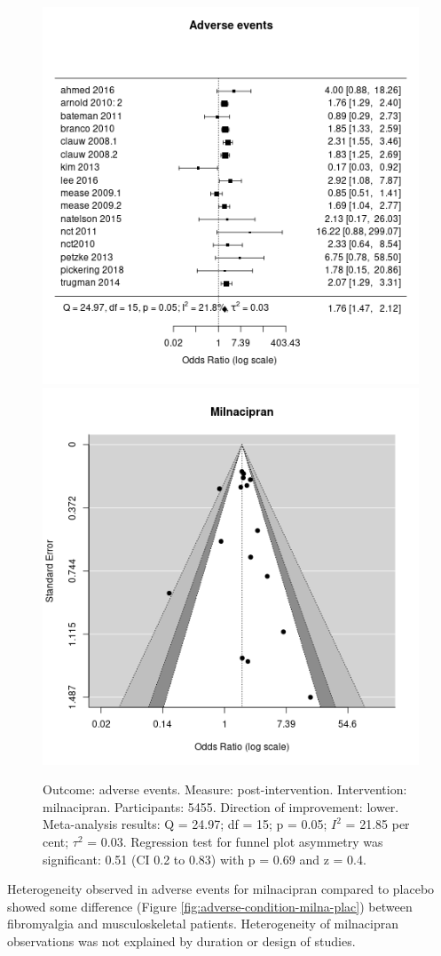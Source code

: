 \documentclass{report}\usepackage[]{graphicx}\usepackage[]{color}
\newenvironment{knitrout}{}{} %
\begin{document}
\begin{figure}

\begin{knitrout}
\color{fgcolor}
\includegraphics[width=0.5\linewidth,height=0.35\textheight]{img/adverse-milnacipran- - -forest} 
\includegraphics[width=0.5\linewidth,height=0.35\textheight]{img/adverse-milnacipran- - -funnel} 
\end{knitrout}

\caption[Adverse events: milnacipran]{Outcome: adverse events. Measure: post-intervention. Intervention: milnacipran. Participants: 5455. Direction of improvement: lower. Meta-analysis results: Q = 24.97; df = 15; p = 0.05; $I^2$ = 21.85 per cent; $\tau^2$ = 0.03. Regression test for funnel plot asymmetry was significant: 0.51 (CI 0.2 to 0.83) with p = 0.69 and z = 0.4.}
\label{fig:adverse-milna}
\end{figure}


Heterogeneity observed in adverse events for milnacipran compared to placebo showed some difference (Figure \ref{fig:adverse-condition-milna-plac}) between fibromyalgia and musculoskeletal patients. Heterogeneity of milnacipran observations was not explained by duration or design of studies.
\end{document}

